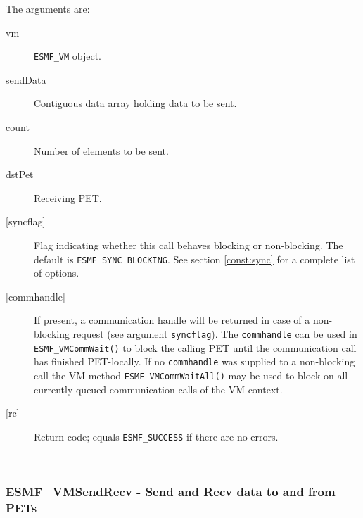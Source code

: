      The arguments are:
     \begin{description}
     \item[vm] 
          {\tt ESMF\_VM} object.
     \item[sendData] 
          Contiguous data array holding data to be sent.
     \item[count] 
          Number of elements to be sent.
     \item[dstPet] 
          Receiving PET.
     \item[{[syncflag]}]
          Flag indicating whether this call behaves blocking or non-blocking.
          The default is {\tt ESMF\_SYNC\_BLOCKING}. See section
          \ref{const:sync} for a complete list of options.
     \item[{[commhandle]}]
          If present, a communication handle will be returned in case of a 
          non-blocking request (see argument {\tt syncflag}). The
          {\tt commhandle} can be used in {\tt ESMF\_VMCommWait()} to block the
          calling PET until the communication call has finished PET-locally. If
          no {\tt commhandle} was supplied to a non-blocking call the VM method
          {\tt ESMF\_VMCommWaitAll()} may be used to block on all currently queued
          communication calls of the VM context.
     \item[{[rc]}] 
          Return code; equals {\tt ESMF\_SUCCESS} if there are no errors.
     \end{description}
   
 
\mbox{}\hrulefill\ 
 
\subsubsection [ESMF\_VMSendRecv] {ESMF\_VMSendRecv - Send and Recv data to and from PETs}


